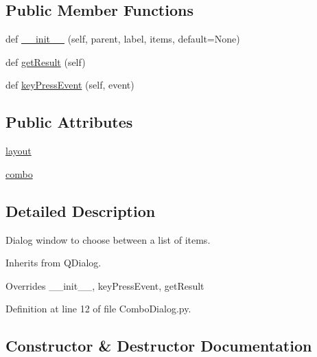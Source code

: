 \subsection*{Public Member Functions}
\begin{DoxyCompactItemize}
\item 
def \mbox{\hyperlink{classwindshape_1_1gui_1_1dialogs_1_1_combo_dialog_1_1_combo_dialog_ae10e66bedddda7e667788128646f8deb}{\+\_\+\+\_\+init\+\_\+\+\_\+}} (self, parent, label, items, default=None)
\item 
def \mbox{\hyperlink{classwindshape_1_1gui_1_1dialogs_1_1_combo_dialog_1_1_combo_dialog_a870bd98cd7dda242ee7da7695fe15be8}{get\+Result}} (self)
\item 
def \mbox{\hyperlink{classwindshape_1_1gui_1_1dialogs_1_1_combo_dialog_1_1_combo_dialog_ac727c542169923ee086ba371eb668ddf}{key\+Press\+Event}} (self, event)
\end{DoxyCompactItemize}
\subsection*{Public Attributes}
\begin{DoxyCompactItemize}
\item 
\mbox{\hyperlink{classwindshape_1_1gui_1_1dialogs_1_1_combo_dialog_1_1_combo_dialog_aefe8cb25193e84448395357dfbb64ca6}{layout}}
\item 
\mbox{\hyperlink{classwindshape_1_1gui_1_1dialogs_1_1_combo_dialog_1_1_combo_dialog_a21538380279736bd0c2f30c9d76dab50}{combo}}
\end{DoxyCompactItemize}


\subsection{Detailed Description}
\begin{DoxyVerb}Dialog window to choose between a list of items.

Inherits from QDialog.

Overrides __init__, keyPressEvent, getResult
\end{DoxyVerb}
 

Definition at line 12 of file Combo\+Dialog.\+py.



\subsection{Constructor \& Destructor Documentation}
\mbox{\label{classwindshape_1_1gui_1_1dialogs_1_1_combo_dialog_1_1_combo_dialog_ae10e66bedddda7e667788128646f8deb}} 
